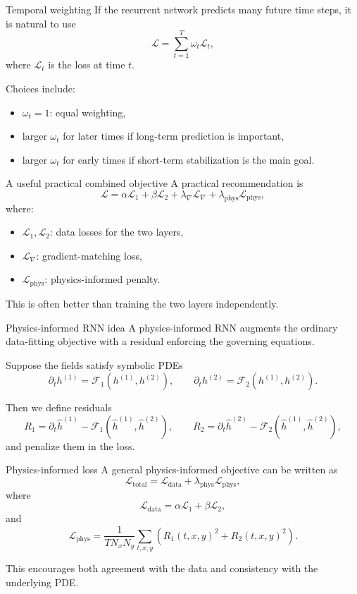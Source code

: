 \documentclass[aspectratio=169]{beamer}
\begin{document}
\begin{frame}{Temporal weighting}
If the recurrent network predicts many future time steps, it is natural to use
\[
\mathcal{L}
=
\sum_{t=1}^{T}\omega_t \mathcal{L}_t,
\]
where \(\mathcal{L}_t\) is the loss at time \(t\).

Choices include:
\begin{itemize}
\item \(\omega_t=1\): equal weighting,
\item larger \(\omega_t\) for later times if long-term prediction is important,
\item larger \(\omega_t\) for early times if short-term stabilization is the main goal.
\end{itemize}
\end{frame}

\begin{frame}{A useful practical combined objective}
A practical recommendation is
\[
\mathcal{L}
=
\alpha \mathcal{L}_1
+
\beta \mathcal{L}_2
+
\lambda_{\nabla}\mathcal{L}_{\nabla}
+
\lambda_{\mathrm{phys}}\mathcal{L}_{\mathrm{phys}},
\]
where:
\begin{itemize}
\item \(\mathcal{L}_1,\mathcal{L}_2\): data losses for the two layers,
\item \(\mathcal{L}_{\nabla}\): gradient-matching loss,
\item \(\mathcal{L}_{\mathrm{phys}}\): physics-informed penalty.
\end{itemize}

This is often better than training the two layers independently.
\end{frame}

\begin{frame}{Physics-informed RNN idea}
A physics-informed RNN augments the ordinary data-fitting objective with a residual enforcing the governing equations.

Suppose the fields satisfy symbolic PDEs
\[
\partial_t h^{(1)} = \mathcal{F}_1(h^{(1)},h^{(2)}),
\qquad
\partial_t h^{(2)} = \mathcal{F}_2(h^{(1)},h^{(2)}).
\]

Then we define residuals
\[
R_1 = \partial_t \hat h^{(1)} - \mathcal{F}_1(\hat h^{(1)},\hat h^{(2)}),
\qquad
R_2 = \partial_t \hat h^{(2)} - \mathcal{F}_2(\hat h^{(1)},\hat h^{(2)}),
\]
and penalize them in the loss.
\end{frame}

\begin{frame}{Physics-informed loss}
A general physics-informed objective can be written as
\[
\mathcal{L}_{\mathrm{total}}
=
\mathcal{L}_{\mathrm{data}}
+
\lambda_{\mathrm{phys}}\mathcal{L}_{\mathrm{phys}},
\]
where
\[
\mathcal{L}_{\mathrm{data}}
=
\alpha \mathcal{L}_1 + \beta \mathcal{L}_2,
\]
and
\[
\mathcal{L}_{\mathrm{phys}}
=
\frac{1}{T N_x N_y}
\sum_{t,x,y}
\left(
R_1(t,x,y)^2 + R_2(t,x,y)^2
\right).
\]

This encourages both agreement with the data and consistency with the underlying PDE.
\end{frame}
\end{document}

